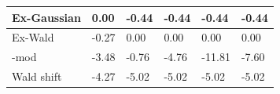 \begin{tabular}{|l|l|l|l|l|l|}
\hline
Ex-Gaussian&0.00&-0.44&-0.44&-0.44&-0.44\\\hline
Ex-Wald&-0.27&0.00&0.00&0.00&0.00\\\hline
\rocdd{}-mod&-3.48&-0.76&-4.76&-11.81&-7.60\\\hline
Wald shift&-4.27&-5.02&-5.02&-5.02&-5.02\\\hline
\end{tabular}
